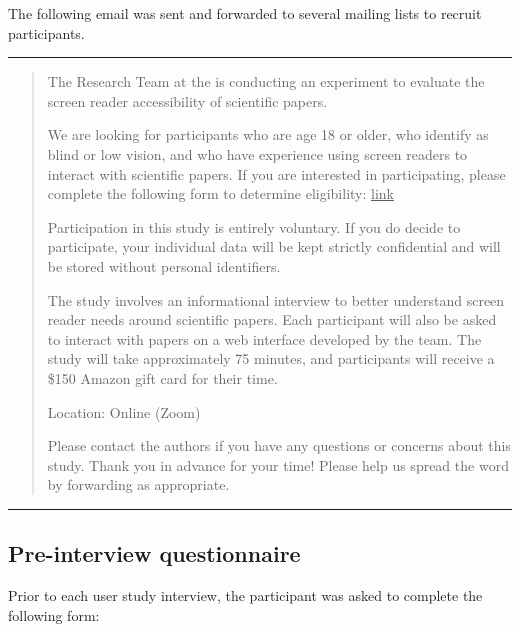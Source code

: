 The following email was sent and forwarded to several mailing lists to recruit participants.

\begin{center}
\noindent \rule{0.9\linewidth}{0.4pt}
\end{center}
\begin{quote}
The \semanticscholar Research Team at the \allenai is conducting an experiment to evaluate the screen reader accessibility of scientific papers.

\vspace{4pt}\noindent We are looking for participants who are age 18 or older, who identify as blind or low vision, and who have experience using screen readers to interact with scientific papers. If you are interested in participating, please complete the following form to determine eligibility: \underline{link}

\vspace{4pt}\noindent Participation in this study is entirely voluntary. If you do decide to participate, your individual data will be kept strictly confidential and will be stored without personal identifiers.

\vspace{4pt}\noindent The study involves an informational interview to better understand screen reader needs around scientific papers. Each participant will also be asked to interact with papers on a web interface developed by the team. The study will take approximately 75 minutes, and participants will receive a \$150 Amazon gift card for their time.

\vspace{4pt}\noindent Location: Online (Zoom)

\vspace{4pt}\noindent Please contact the authors if you have any questions or concerns about this study. Thank you in advance for your time! Please help us spread the word by forwarding as appropriate.
\end{quote}
\begin{center}
\noindent \rule{0.9\linewidth}{0.4pt}
\end{center}

\subsection{Pre-interview questionnaire}
\label{app:pre_interview_questionnaire}

Prior to each user study interview, the participant was asked to complete the following form:

